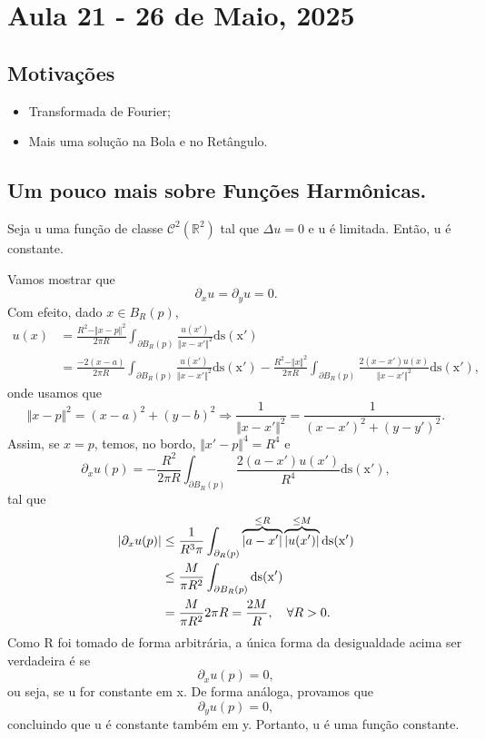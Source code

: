 \documentclass[../pde_notes.tex]{subfiles}
\begin{document}
\section{Aula 21 - 26 de Maio, 2025}
\subsection{Motivações}
\begin{itemize}
	\item Transformada de Fourier;
	\item Mais uma solução na Bola e no Retângulo.
\end{itemize}
\subsection{Um pouco mais sobre Funções Harmônicas.}
\begin{theorem*}
	Seja u uma função de classe \(\mathcal{C}^{2}(\mathbb{R}^{2})\) tal que \(\Delta u = 0\)  e u é limitada. Então, u é constante.
\end{theorem*}
\begin{proof*}
	Vamos mostrar que
	\[
		\partial_x u = \partial_y u = 0.
	\]
	Com efeito, dado \(x\in B_R(p)\),
	\begin{align*}
		u(x) & = \frac{R^{2}-\Vert x-p \Vert^{2}}{2\pi R}\int_{\partial B_{R}(p)}^{}\frac{u(x')}{\Vert x-x' \Vert^{2}} \mathrm{ds(x')}                                                                                                       \\
		     & =\frac{-2(x-a)}{2\pi R}\int_{\partial B_R(p)}^{}\frac{u(x')}{\Vert x-x' \Vert^{2}} \mathrm{ds(x')} - \frac{R^{2}-\Vert x \Vert^{2}}{2\pi R}\int_{\partial B_R(p)}^{}\frac{2(x-x')u(x)}{\Vert x-x' \Vert^{2}} \mathrm{ds(x')},
	\end{align*}
	onde usamos que
	\[
		\Vert x-p \Vert^{2} = (x-a)^{2}+(y-b)^{2} \Rightarrow \frac{1}{\Vert x-x' \Vert^{2}}=\frac{1}{(x-x')^{2}+(y-y')^{2}}.
	\]
	Assim, se \(x = p\), temos, no bordo, \(\Vert x'-p \Vert^{4}=R^{4}\) e
	\[
		\partial_x u(p) = -\frac{R^{2}}{2\pi R}\int_{\partial B_R(p)}^{}\frac{2(a-x')u(x')}{R^{4}} \mathrm{ds(x')},
	\]
	tal que
	\begin{align*}
		|\partial_xu(p)| & \leq \frac{1}{R^{3}\pi }\int_{\partial_R(p)}^{}\overbrace{|a-x'|}^{\mathclap{\leq R}}\overbrace{|u(x')|}^{\mathclap{\leq M}} \mathrm{ds(x')} \\
		                 & \leq \frac{M}{\pi R^{2}}\int_{\partial B_R(p)}^{} \mathrm{ds(x')}                                                                            \\
		                 & = \frac{M}{\pi R^{2}}2\pi R = \frac{2M}{R},\quad \forall R > 0.
	\end{align*}
	Como R foi tomado de forma arbitrária, a única forma da desigualdade acima ser verdadeira é se
	\[
		\partial_x u(p) = 0,
	\]
	ou seja, se u for constante em x. De forma análoga, provamos que
	\[
		\partial_y u(p) = 0,
	\]
	concluindo que u é constante também em y. Portanto, u é uma função constante. \qedsymbol
\end{proof*}
\end{document}

